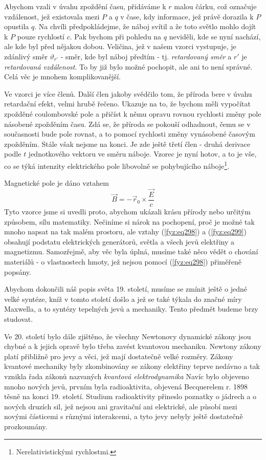{    Abychom vzali v úvahu zpoždění času, přidáváme k \(r\) malou čárku, což označuje vzdálenost, 
    jež existovala mezi \(P\) a \(q\) v čase, kdy informace, jež právě dorazila k \(P\) opustila 
    \(q\). Na chvíli předpokládejme, že náboj svítil a že toto světlo mohlo dojít k \(P\) pouze 
    rychlostí \(c\). Pak bychom při pohledu na \(q\) neviděli, kde se nyní nachází, ale kde byl 
    před nějakou dobou. Veličina, jež v našem vzorci vystupuje, je zdánlivý směr \(\vartheta_{r'}\) 
    - směr, kde byl náboj předtím - tj. \emph{retardovaný směr} a \(r'\) je \emph{retardovaná 
    vzdálenost}. To by již bylo možné pochopit, ale ani to není správné. Celá věc je mnohem 
    komplikovanější. 
    
    Ve vzorci je více členů. Další člen jakoby svědčilo tom, že příroda bere v úvahu retardační 
    efekt, velmi hrubě řečeno. Ukazuje na to, že bychom měli vypočítat zpožděné coulombovské pole a 
    přičíst k němu opravu rovnou rychlosti změny pole násobené zpožděním času. Zdá se, že příroda 
    se pokouší odhadnout, čemu se v současnosti bude pole rovnat, a to pomocí rychlosti změny 
    vynásobené časovým zpožděním. Stále však nejsme na konci. Je zde ještě třetí člen - druhá 
    derivace podle \(t\) jednotkového vektoru ve směru náboje. Vzorec je nyní hotov, a to je vše, 
    co se týká intenzity elektrického pole libovolně se pohybujícího 
    náboje\footnote{Nerelativistickými rychlostmi.}.
    
    Magnetické pole je dáno vztahem
    \begin{equation}\label{fyz:eq299}
      \vec{B} = -\vec{r}_0\times\frac{\vec{E}}{c}
    \end{equation}
    Tyto vzorce jsme si uvedli proto, abychom ukázali krásu přírody nebo určitým způsobem, sílu 
    matematiky. Nečiníme si nárok na pochopení, proč je možné tak mnoho napsat na tak malém 
    prostoru, ale vztahy (\ref{fyz:eq298}) a (\ref{fyz:eq299}) obsahují podstatu elektrických 
    generátorů, světla a všech jevů elektřiny a magnetizmu. Samozřejmě, aby věc byla úplná, musíme 
    také něco vědět o chování materiálů - o vlastnostech hmoty, jež nejsou pomocí (\ref{fyz:eq298}) 
    přiměřeně popsány.
    
    Abychom dokončili náš popis světa 19. století, musíme se zmínit ještě o jedné velké syntéze, 
    kníž v tomto století došlo a jež se také týkala do značné míry Maxwella, a to syntézy tepelných 
    jevů a mechaniky. Tento předmět budeme brzy studovat.
   
    Ve 20. století bylo dále zjištěno, že všechny Newtonovy dynamické zákony jsou chybné a k jejich 
    opravě bylo třeba zavést kvantovou mechaniku. Newtony zákony platí přibližně pro jevy a věci, 
    jež mají dostatečně velké rozměry. Zákony kvantové mechaniky byly zkombinovány se zákony 
    elektřiny teprve nedávno a tak vznikla řada zákonů nazvaných \emph{kvantová elektrodynamika} 
    Navíc bylo objeveno mnoho nových jevů, prvním byla radioaktivita, objevená Becquerelem r. 1898 
    těsně na konci 19. století. Studium radioaktivity přineslo poznatky o jádrech a o nových 
    druzích sil, jež nejsou ani gravitační ani elektrické, ale působí mezi novými částicemi s 
    různými interakcemi, a tyto jevy nebyly ještě dostatečně prozkoumány.
    
}
